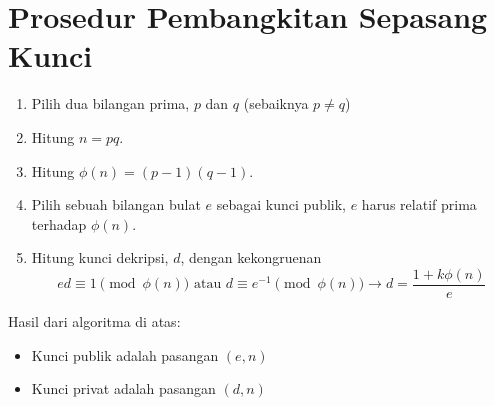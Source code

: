 \documentclass{article}
\begin{document}

\section*{Prosedur Pembangkitan Sepasang Kunci}

\begin{enumerate}
  \item Pilih dua bilangan prima, $p$ dan $q$ (sebaiknya $p \neq q$)
  \item Hitung $n = pq$.
  \item Hitung $\phi(n) = (p-1)(q-1)$.
  \item Pilih sebuah bilangan bulat $e$ sebagai kunci publik, $e$ harus relatif prima terhadap $\phi(n)$.
  \item Hitung kunci dekripsi, $d$, dengan kekongruenan
  \[ ed \equiv 1 \pmod{\phi(n)} \text{ atau } d \equiv e^{-1} \pmod{\phi(n)} \to d = \frac{1+k\phi(n)}{e} \]
\end{enumerate}

Hasil dari algoritma di atas:
\begin{itemize}
  \item Kunci publik adalah pasangan $(e, n)$
  \item Kunci privat adalah pasangan $(d, n)$
\end{itemize}
\end{document}
